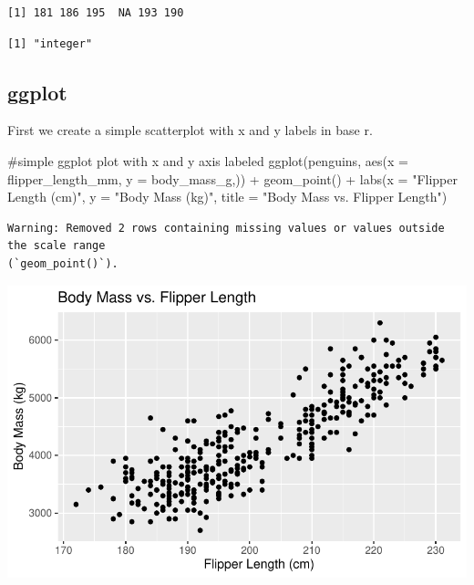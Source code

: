 \documentclass[
  letterpaper,
  DIV=11,
  numbers=noendperiod]{scrreprt}
\newenvironment{Shaded}{\begin{snugshade}}{\end{snugshade}}
\newcommand{\AttributeTok}[1]{\textcolor[rgb]{0.40,0.45,0.13}{#1}}
\newcommand{\CommentTok}[1]{\textcolor[rgb]{0.37,0.37,0.37}{#1}}
\newcommand{\FunctionTok}[1]{\textcolor[rgb]{0.28,0.35,0.67}{#1}}
\newcommand{\NormalTok}[1]{\textcolor[rgb]{0.00,0.23,0.31}{#1}}
\newcommand{\SpecialCharTok}[1]{\textcolor[rgb]{0.37,0.37,0.37}{#1}}
\newcommand{\StringTok}[1]{\textcolor[rgb]{0.13,0.47,0.30}{#1}}
\begin{document}
\begin{verbatim}
[1] 181 186 195  NA 193 190
\end{verbatim}

\begin{Shaded}
\end{Shaded}

\begin{verbatim}
[1] "integer"
\end{verbatim}

\subsection{ggplot}

First we create a simple scatterplot with x and y labels in base r.

\begin{Shaded}
\begin{Highlighting}[]
\CommentTok{\#simple ggplot plot with x and y axis labeled}
\FunctionTok{ggplot}\NormalTok{(penguins, }\FunctionTok{aes}\NormalTok{(}\AttributeTok{x =}\NormalTok{ flipper\_length\_mm, }\AttributeTok{y =}\NormalTok{ body\_mass\_g,)) }\SpecialCharTok{+}
  \FunctionTok{geom\_point}\NormalTok{() }\SpecialCharTok{+}
  \FunctionTok{labs}\NormalTok{(}\AttributeTok{x =} \StringTok{"Flipper Length (cm)"}\NormalTok{, }\AttributeTok{y =} \StringTok{"Body Mass (kg)"}\NormalTok{,}
       \AttributeTok{title =} \StringTok{"Body Mass vs. Flipper Length"}\NormalTok{)}
\end{Highlighting}
\end{Shaded}

\begin{verbatim}
Warning: Removed 2 rows containing missing values or values outside the scale range
(`geom_point()`).
\end{verbatim}

\includegraphics{scripts/02_dataViz/class4_files/figure-pdf/numvsnum2_ggplot-1.pdf}
\end{document}
